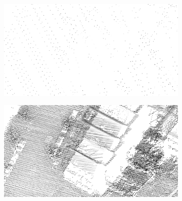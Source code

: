 
\begin{figure}
	\centering
	\begin{subfigure}{0.45\linewidth}
		\includegraphics[width=\textwidth]{figs/ahn1_d.png}
		\label{fig:pcd:ahn1}
	\end{subfigure}
	\quad
	\begin{subfigure}{0.45\linewidth}
		\includegraphics[width=\textwidth]{figs/ahn2_d.png}
		\label{fig:pcd:ahn2}
	\end{subfigure}
	

\end{figure}
